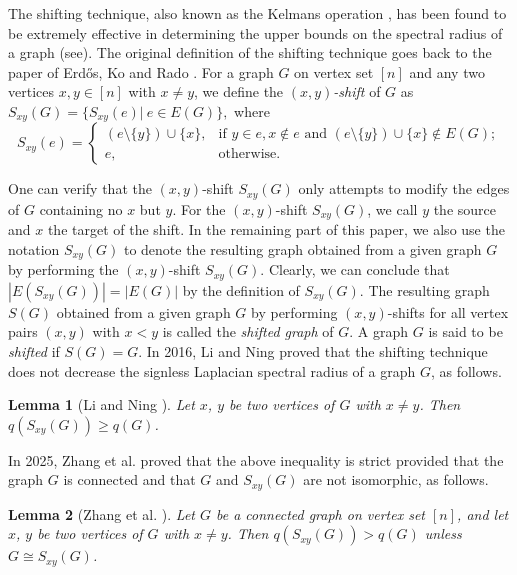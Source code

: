 \documentclass[11pt,a4paper]{article}
\newtheorem{lemma}{Lemma}[section]
\theoremstyle{definition}
\numberwithin{equation}{section}
\begin{document}
The shifting technique\cite{Frankl1}, also known as the Kelmans operation \cite{Kelmans}, has been found to be extremely effective in determining the upper bounds on the spectral radius of a graph (see\cite{Frankl2}). The original definition of the shifting technique goes back to the paper of Erd\H{o}s, Ko and Rado \cite{Erdos}. For a graph $G$ on vertex set $[n]$ and any two vertices $x, y\in[n]$ with $x\ne y$, we define the \emph{$(x,y)$-shift} of $G$ as ${S_{xy}}(G)=\{{{S_{xy}}(e)|~e \in E(G)}\},$ where
\[S_{xy}(e)=
\begin{cases}(e\setminus\{y\})\cup\{x\},&\text{if }y\in e,x\notin e\text{ and } (e\setminus\{y\})\cup\{x\}\notin E(G); \\
e,&\text{otherwise}.
\end{cases}\]

One can verify that the $\left( {x,y} \right)$-shift ${S_{xy}}(G)$ only attempts to modify the edges of $G$ containing no $x$ but $y$. For the $\left( {x,y} \right)$-shift ${S_{xy}}(G)$, we call $y$ the source and $x$ the target of the shift. In the remaining part of this paper, we also use the notation ${S_{xy}}(G)$ to denote the resulting graph obtained from a given graph $G$ by performing the $(x, y)$-shift ${S_{xy}}(G)$. Clearly, we can conclude that $|E(S_{xy}(G))|=|E(G)|$ by the definition of ${S_{xy}}(G)$. The resulting graph $S(G)$ obtained from a given graph $G$ by performing $(x,y)$-shifts for all vertex pairs $(x, y)$ with $x<y$ is called the \emph{shifted graph} of $G$. A graph $G$ is said to be \emph{shifted} if $S(G)=G$. In 2016, Li and Ning \cite{Li-Ning} proved that the shifting technique does not decrease the signless Laplacian spectral radius of a graph $G$, as follows.

\begin{lemma}[Li and Ning \cite{Li-Ning}]\label{lemma1b}
Let $x$, $y$ be two vertices of $G$ with $x\ne y$. Then $q({S_{xy}(G)})\ge q(G)$.
\end{lemma}

In 2025, Zhang et al. \cite{X.Zhang} proved that the above inequality is strict provided that the graph $G$ is connected and that $G$ and ${S_{xy}}(G)$ are not isomorphic, as follows.

\begin{lemma}[Zhang et al. \cite{X.Zhang}]\label{lemma2b}
Let $G$ be a connected graph on vertex set $[n]$, and let $x$, $y$ be two vertices of $G$ with $x\ne y$. Then $q({S_{xy}(G)})>q(G)$ unless $G\cong{S_{xy}}(G)$.
\end{lemma}
\end{document}
